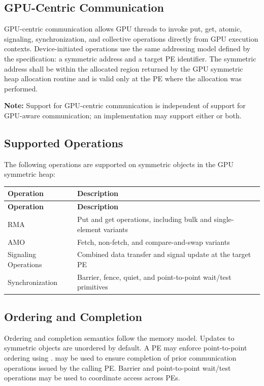 \subsection{GPU-Centric Communication}\label{subsec:gpu_centric_comm}

GPU-centric communication allows \ac{GPU} threads to invoke put, get, atomic,
signaling, synchronization, and collective operations directly from \ac{GPU}
execution contexts. Device-initiated
operations use the same addressing model defined by the \openshmem
specification: a symmetric address and a target \ac{PE} identifier. The
symmetric address shall be within the allocated region returned by the \ac{GPU} symmetric heap
allocation routine and is valid only at the \ac{PE} where the allocation was
performed.

\textbf{Note:} Support for GPU-centric communication is independent of support
for GPU-aware communication; an implementation may support either or both.

\subsection{Supported Operations}\label{subsec:supported_operations}

The following operations are supported on symmetric objects in the \ac{GPU}
symmetric heap:

\begin{longtable}{|p{5cm}|p{9cm}|}
\hline
\textbf{Operation} & \textbf{Description} \\
\hline
\endfirsthead
\hline
\textbf{Operation} & \textbf{Description} \\
\hline
\endhead
\ac{RMA} & Put and get operations, including bulk and single-element variants \\
\hline
\ac{AMO} & Fetch, non-fetch, and compare-and-swap variants \\
\hline
Signaling Operations & Combined data transfer and signal update at the target \ac{PE} \\
\hline
Synchronization & Barrier, fence, quiet, and point-to-point wait/test primitives \\
\hline
\end{longtable}

\subsection{Ordering and Completion}\label{subsec:ordering_completion}

Ordering and completion semantics follow the \openshmem memory model. Updates to
symmetric objects are unordered by default. A \ac{PE} may enforce point-to-point
ordering using .  may be used to ensure
completion of prior communication operations issued by the calling \ac{PE}.
Barrier and point-to-point wait/test operations may be used to coordinate access
across \acp{PE}.

